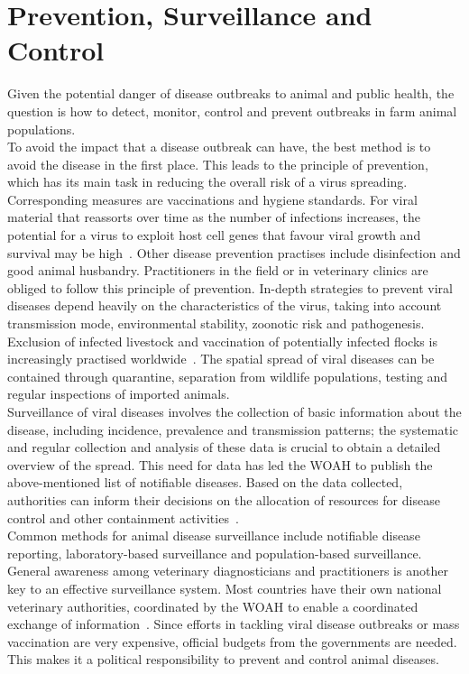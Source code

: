 \section{Prevention, Surveillance and Control}
Given the potential danger of disease outbreaks to animal and public health, the question is how to detect, monitor, control and prevent outbreaks in farm animal populations. \\
To avoid the impact that a disease outbreak can have, the best method is to avoid the disease in the first place. This leads to the principle of prevention, which has its main task in reducing the overall risk of a virus spreading. Corresponding measures are vaccinations and hygiene standards. For viral material that reassorts over time as the number of infections increases, the potential for a virus to exploit host cell genes that favour viral growth and survival may be high~\cite{fenner2017maclachlan}. Other disease prevention practises include disinfection and good animal husbandry. Practitioners in the field or in veterinary clinics are obliged to follow this principle of prevention. In-depth strategies to prevent viral diseases depend heavily on the characteristics of the virus, taking into account transmission mode, environmental stability, zoonotic risk and pathogenesis. Exclusion of infected livestock and vaccination of potentially infected flocks is increasingly practised worldwide~\cite{fenner2017maclachlan}. The spatial spread of viral diseases can be contained through quarantine, separation from wildlife populations, testing and regular inspections of imported animals. \\
Surveillance of viral diseases involves the collection of basic information about the disease, including incidence, prevalence and transmission patterns; the systematic and regular collection and analysis of these data is crucial to obtain a detailed overview of the spread. This need for data has led the \ac{WOAH} to publish the above-mentioned list of notifiable diseases. Based on the data collected, authorities can inform their decisions on the allocation of resources for disease control and other containment activities~\cite{fenner2017maclachlan, who2017one}. \\
Common methods for animal disease surveillance include notifiable disease reporting, laboratory-based surveillance and population-based surveillance. General awareness among veterinary diagnosticians and practitioners is another key to an effective surveillance system. Most countries have their own national veterinary authorities, coordinated by the \ac{WOAH} to enable a coordinated exchange of information~\cite{who2017one}. Since efforts in tackling viral disease outbreaks or mass vaccination are very expensive, official budgets from the governments are needed. This makes it a political responsibility to prevent and control animal diseases. \\
